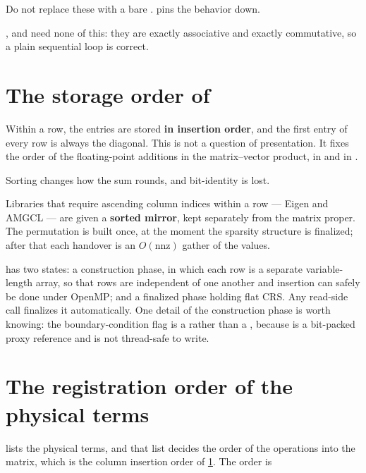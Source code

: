 \begin{warn}
  Do not replace these with a bare .
   pins the behavior down.
\end{warn}

,  and  need none of this: they are exactly
associative and exactly commutative, so a plain sequential loop is correct.

\section{The storage order of }
\label{sec:repro:crs}

Within a row, the entries are stored \textbf{in insertion order}, and the first
entry of every row is always the diagonal. This is not a question of
presentation. It fixes the order of the floating-point additions in the
matrix--vector product, in  and in .

\begin{warn}
  Sorting changes how the sum rounds, and bit-identity is lost.
\end{warn}

Libraries that require ascending column indices within a row --- Eigen and
AMGCL --- are given a \textbf{sorted mirror}, kept separately from the matrix
proper. The permutation is built once, at the moment the sparsity structure is
finalized; after that each handover is an $O(\mathrm{nnz})$ gather of the
values.

 has two states: a construction phase, in which each row is a
separate variable-length array, so that rows are independent of one another and
insertion can safely be done under OpenMP; and a finalized phase holding flat
CRS. Any read-side call finalizes it automatically. One detail of the
construction phase is worth knowing: the boundary-condition flag is a
 rather than a , because  is a
bit-packed proxy reference and is not thread-safe to write.

\section{The registration order of the physical terms}
\label{sec:repro:order}

 lists the physical
terms, and that list decides the order of the \code{+=} operations into the
matrix, which is the column insertion order of \cref{sec:repro:crs}. The order
is

